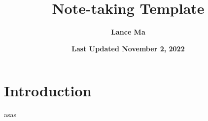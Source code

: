 \documentclass{article}
\title{\textbf{Note-taking Template}}
\author{\textbf{Lance Ma}}
\date{\textbf{Last Updated November 2, 2022}}
\begin{document}
\maketitle



\section{Introduction}

\newpage

asas
\end{document}

